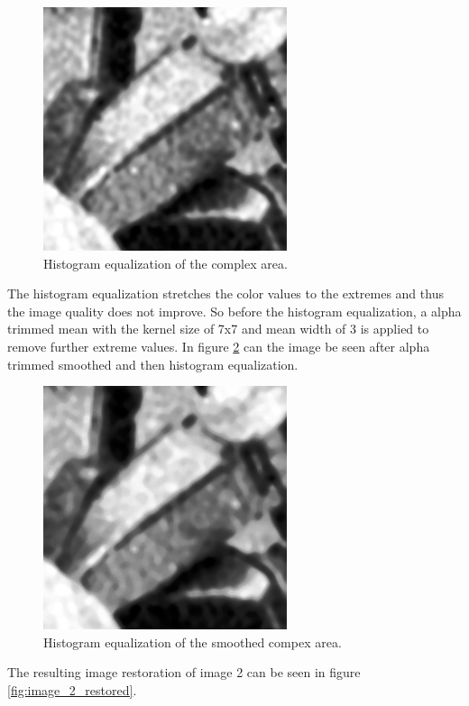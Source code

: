 \begin{figure}[H]
\centering
\includegraphics[width = \cutOutWidth]{graphics/complex2_histeq.png}
\caption{Histogram equalization of the complex area.}
\label{fig:complex2_histeq}
\end{figure}


The histogram equalization stretches the color values to the extremes and thus the image quality does not improve.
So before the histogram equalization, a alpha trimmed mean with the kernel size of 7x7 and mean width of 3 is applied to remove further extreme values.
In figure \ref{fig:complex2_histeq_smoothed} can the image be seen after alpha trimmed smoothed and then histogram equalization.

\begin{figure}[H]
\centering
\includegraphics[width = \cutOutWidth]{graphics/complex2_histeq_smoothed.png}
\caption{Histogram equalization of the smoothed compex area.}
\label{fig:complex2_histeq_smoothed}
\end{figure}

The resulting image restoration of image 2 can be seen in figure \ref{fig:image_2_restored}.

